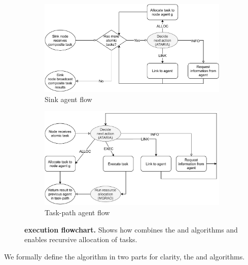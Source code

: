 \begin{figure}[ht]
	\centering
	\begin{subfigure}{.49\textwidth}
		\centering
		\includegraphics[width=0.9\linewidth, trim={25pt 0pt 25pt 0pt, clip}]{algorithm-flow-sink}
		\caption{Sink agent flow}
		\label{fig:algorithm-flow-sink}
	\end{subfigure} \hfill%
	\begin{subfigure}{.49\textwidth}
		\centering	\includegraphics[width=0.9\linewidth,trim={25pt 0pt 25pt 0pt, clip}]{algorithm-flow-arc}
		\caption{Task-path agent flow}
		\label{fig:algorithm-flow-arc}
	\end{subfigure}
	\caption{\textbf{\acronymWSNOptimisation{}{} execution flowchart.} Shows how \acronymWSNOptimisation{}{} combines the \acronymATARIA{}{} and \acronymMGRAO{}{} algorithms and enables recursive allocation of tasks.}
	\label{fig:algorithm-flow}
\end{figure}
We formally define the \acronymWSNOptimisation{}{} algorithm in two parts for clarity, the \acronymWSNOptimisationSink{}{} and \acronymWSNOptimisationArc{}{} algorithms.

